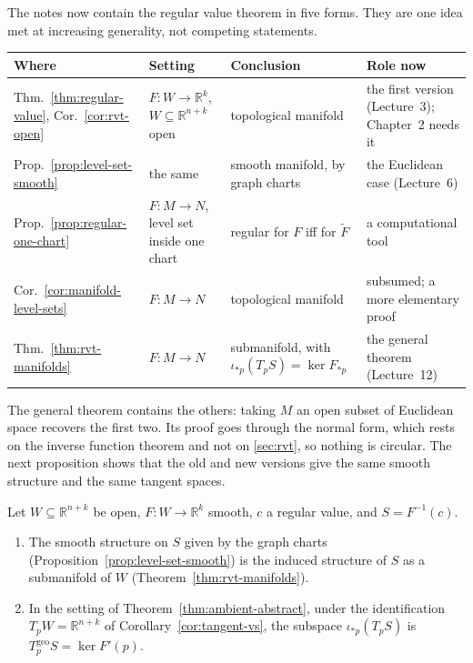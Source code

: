\documentclass[11pt]{report}
\makeatletter
\newcounter{thmcounter}[section]
\newcommand{\thmlabel}[1]{\edef\@currentlabel{\arabic{section}.\arabic{thmcounter}}\label{#1}}
\newcommand{\geo}{\mathrm{geo}}
\makeatother
\begin{document}
\begin{rembox}\label{rem:regular-value-theorems-old-new}
The notes now contain the regular value theorem in five forms. They are one idea met at increasing generality, not competing statements.
\begin{center}
\renewcommand{\arraystretch}{1.2}
\begin{tabular}{>{\raggedright\arraybackslash}p{2.5cm} >{\raggedright\arraybackslash}p{2.9cm} >{\raggedright\arraybackslash}p{3.0cm} >{\raggedright\arraybackslash}p{3.0cm}}
\toprule
\textbf{Where} & \textbf{Setting} & \textbf{Conclusion} & \textbf{Role now} \\ \midrule
Thm.~\ref{thm:regular-value}, Cor.~\ref{cor:rvt-open} & $F : W \to \mathbb{R}^k$, $W \subseteq \mathbb{R}^{n+k}$ open & topological manifold & the first version (Lecture~3); Chapter~2 needs it \\
Prop.~\ref{prop:level-set-smooth} & the same & smooth manifold, by graph charts & the Euclidean case (Lecture~6) \\
Prop.~\ref{prop:regular-one-chart} & $F : M \to N$, level set inside one chart & regular for $F$ iff for $\tilde F$ & a computational tool \\
Cor.~\ref{cor:manifold-level-sets} & $F : M \to N$ & topological manifold & subsumed; a more elementary proof \\
Thm.~\ref{thm:rvt-manifolds} & $F : M \to N$ & submanifold, with $\iota_{*p}(T_pS) = \ker F_{*p}$ & the general theorem (Lecture~12) \\
\bottomrule
\end{tabular}
\end{center}
The general theorem contains the others: taking $M$ an open subset of Euclidean space recovers the first two. Its proof goes through the normal form, which rests on the inverse function theorem and not on \ref{sec:rvt}, so nothing is circular. The next proposition shows that the old and new versions give the same smooth structure and the same tangent spaces.
\end{rembox}

\begin{propbox}\thmlabel{prop:rvt-agree}
Let $W \subseteq \mathbb{R}^{n+k}$ be open, $F : W \to \mathbb{R}^k$ smooth, $c$ a regular value, and $S = F^{-1}(c)$.
\begin{enumerate}
    \item The smooth structure on $S$ given by the graph charts (Proposition~\ref{prop:level-set-smooth}) is the induced structure of $S$ as a submanifold of $W$ (Theorem~\ref{thm:rvt-manifolds}).
    \item In the setting of Theorem~\ref{thm:ambient-abstract}, under the identification $T_pW = \mathbb{R}^{n+k}$ of Corollary~\ref{cor:tangent-vs}, the subspace $\iota_{*p}(T_pS)$ is $T^{\geo}_pS = \ker F'(p)$.
\end{enumerate}
\end{propbox}
\end{document}
